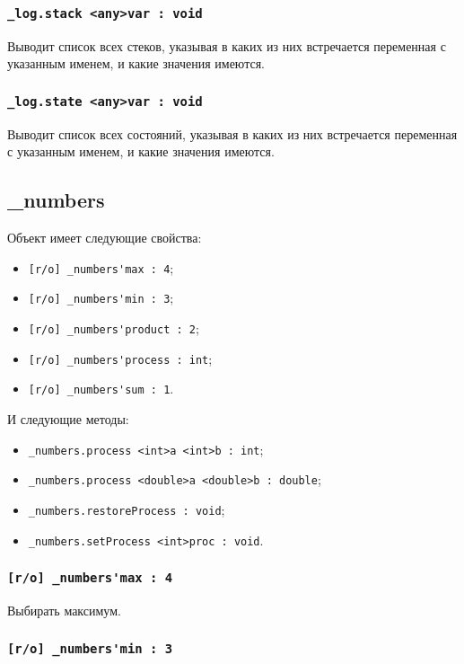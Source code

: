 \documentclass[a4paper, 14pt]{extarticle}
\newenvironment{icItems}
	{ \begin{itemize} [noitemsep,nolistsep] }
	{ \end{itemize} }
\begin{document}
\subsubsection{\lstinline|_log.stack <any>var : void|}

Выводит список всех стеков, указывая в каких из них встречается переменная с указанным именем, и какие значения имеются.

\subsubsection{\lstinline|_log.state <any>var : void|}

Выводит список всех состояний, указывая в каких из них встречается переменная с указанным именем, и какие значения имеются.

\subsection{{\color{orange} \_numbers}}

Объект \numbers{} имеет следующие свойства:
\begin{icItems}
	\item \lstinline|[r/o] _numbers'max : 4|;
	\item \lstinline|[r/o] _numbers'min : 3|;
	\item \lstinline|[r/o] _numbers'product : 2|;
	\item \lstinline|[r/o] _numbers'process : int|;
	\item \lstinline|[r/o] _numbers'sum : 1|.
\end{icItems}

И следующие методы:
\begin{icItems}
	\item \lstinline|_numbers.process <int>a <int>b : int|;
	\item \lstinline|_numbers.process <double>a <double>b : double|;
	\item \lstinline|_numbers.restoreProcess : void|;
	\item \lstinline|_numbers.setProcess <int>proc : void|.
\end{icItems}

\subsubsection{\lstinline|[r/o] _numbers'max : 4|}

Выбирать максимум.

\subsubsection{\lstinline|[r/o] _numbers'min : 3|}
\end{document}
